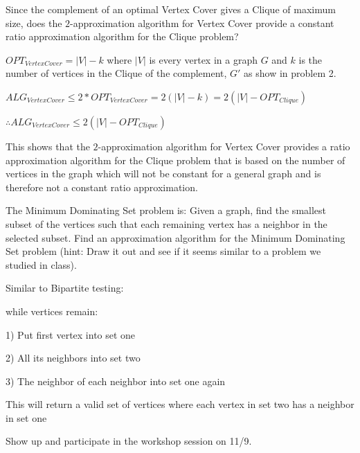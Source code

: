 \documentclass[12pt]{article}
\newenvironment{problem}[2][Problem]
{\begin{trivlist}
\item[\hskip \labelsep {\bfseries #1}\hskip \labelsep {\bfseries #2.}]}{\end{trivlist}}
\begin{document}
\begin{problem}{3}
Since the complement of an optimal Vertex Cover gives a Clique of maximum size, does the $2$-approximation algorithm for Vertex Cover provide a constant ratio approximation algorithm for the Clique problem?


$OPT_{Vertex Cover} = |V| - k$ where $|V|$ is every vertex in a graph $G$ and $k$ is the number of vertices in the Clique of the complement, $G'$ as show in problem 2.

$ALG_{Vertex Cover} \le 2*OPT_{Vertex Cover} = 2(|V| - k) = 2(|V| - OPT_{Clique})$

$\therefore ALG_{Vertex Cover} \le 2(|V| - OPT_{Clique})$

This shows that the $2$-approximation algorithm for Vertex Cover provides a ratio approximation algorithm for the Clique problem that is based on the number of vertices in the graph which will not be constant for a general graph and is therefore not a constant ratio approximation.
\end{problem}


\begin{problem}{4*}
The Minimum Dominating Set problem is: Given a graph, find the smallest subset of the vertices such that each remaining vertex has a neighbor in the selected subset. Find an approximation algorithm for the Minimum Dominating Set problem (hint: Draw it out and see if it seems similar to a problem we studied in class).

Similar to Bipartite testing:

while vertices remain:

1) Put first vertex into set one

2) All its neighbors into set two

3) The neighbor of each neighbor into set one again

This will return a valid set of vertices where each vertex in set two has a neighbor in set one

\end{problem}


\begin{problem}{5}
Show up and participate in the workshop session on 11/9.
\end{problem}
\end{document}
